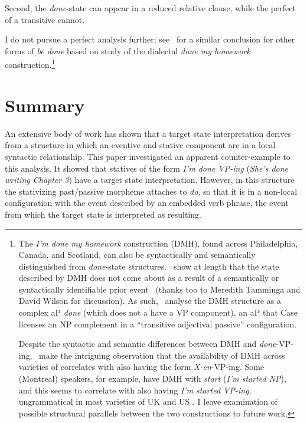 \documentclass[output=paper,modfonts,nonflat]{langsci/langscibook}
\begin{document}
Second, the \emph{done}-state can appear in a reduced relative clause, while the perfect of a transitive cannot.


\begin{exe}
\ex
\begin{xlist}
\end{xlist}
\end{exe}

I do not pursue a perfect analysis further; see~\cite{Fruehwald2015a} for a
similar conclusion for other forms of \emph{be done} based on study of the
dialectal \emph{done my homework} construction.\footnote{The \emph{I'm done my
    homework} construction (\gls{DMH}), found across
    Philadelphia, Canada, and Scotland, can also be syntactically and
    semantically distinguished from \emph{done}-state
    structures.~\cite{Fruehwald2015a} show at length that the state described
    by \gls{DMH} does not come about as a result of a semantically or
    syntactically identifiable prior event~\citep[154--157]{Fruehwald2015a}
    (thanks too to Meredith Tamminga and David Wilson for discussion). As
    such,~\cite{Fruehwald2015a} analyse the \gls{DMH} structure as a complex aP
    \emph{done} (which does not a have a VP component), an aP that Case
    licenses an NP complement in a \enquote{transitive adjectival passive}
    configuration.

Despite the syntactic and semantic differences between \gls{DMH} and
\emph{done}-VP-ing,~\cite{Fruehwald2015a} make the intriguing observation that
the availability of DMH across varieties of  correlates with also having
the form \emph{X-en}-VP-ing. Some (Montreal) speakers, for example, have DMH
with \emph{start} (\emph{I'm started NP}), and this seems to correlate with
also having \emph{I'm started VP-ing}, ungrammatical in most varieties of UK
and US . I leave examination of possible structural parallels between
the two constructions to future work.}

\section{Summary}\label{summary}\largerpage

An extensive body of work has shown that a target state interpretation derives
from a structure in which an eventive and stative component are in a local
syntactic relationship. This paper investigated an apparent counter-example to
this analysis. It showed that statives of the form \emph{I'm done VP-ing}
(\emph{She's done writing Chapter 3}) have a target state interpretation.
However, in this structure the stativizing past/passive morpheme attaches to
\emph{do}, so that it is in a non-local configuration with the event described
by an embedded verb phrase, the event from which the target state is
interpreted as resulting.
\end{document}
